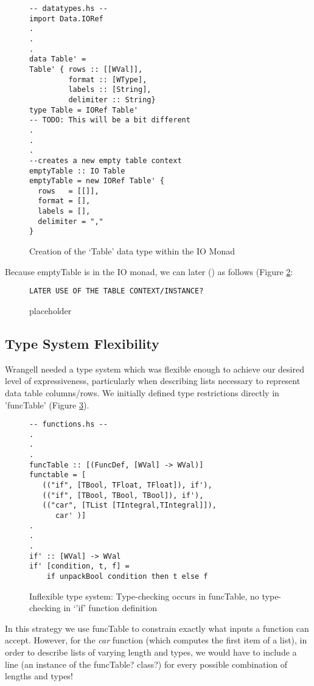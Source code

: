\documentclass[preprint,nocopyrightspace]{sig-alternate}
\begin{document}
\begin{figure}
\caption{Creation of the `Table' data type within the IO Monad}
\begin{lstlisting}
-- datatypes.hs --
import Data.IORef
.
.
.
data Table' = 
Table' { rows :: [[WVal]], 
         format :: [WType], 
         labels :: [String], 
         delimiter :: String}
type Table = IORef Table' 
-- TODO: This will be a bit different
.
.
.
--creates a new empty table context
emptyTable :: IO Table
emptyTable = new IORef Table' {    
  rows   = [[]],
  format = [],
  labels = [],
  delimiter = ","
}
\end{lstlisting}
\label{tableIORef}
\end{figure}
Because emptyTable is in the IO monad, we can later () as follows (Figure \ref{tableIoRefLaterUse}:
\begin{figure}
\caption{placeholder}
\begin{lstlisting}
LATER USE OF THE TABLE CONTEXT/INSTANCE?
\end{lstlisting}
\label{tableIoRefLaterUse}
\end{figure}

\subsection{Type System Flexibility}
Wrangell needed a type system which was flexible enough to achieve our desired level of expressiveness, particularly when describing lists necessary to represent data table columns/rows. We initially defined type restrictions directly in 'funcTable' (Figure \ref{fig:inflexType}).
\begin{figure}
\caption{Inflexible type system: Type-checking occurs in funcTable, no type-checking in `'if' function definition}
\begin{lstlisting}
-- functions.hs --
.
.
.
funcTable :: [(FuncDef, [WVal] -> WVal)] 
functable = [
   (("if", [TBool, TFloat, TFloat]), if'),
   (("if", [TBool, TBool, TBool]), if'),
   (("car", [TList [TIntegral,TIntegral]]), 
      car' )]    
.
.
.          
if' :: [WVal] -> WVal
if' [condition, t, f] = 
    if unpackBool condition then t else f

\end{lstlisting}
\label{fig:inflexType}
\end{figure}
In this strategy we use funcTable to constrain exactly what inputs a function can accept. However, for the \emph{car} function (which computes the first item of a list), in order to describe lists of varying length and types, we would have to include a line (an instance of the funcTable? class?) for every possible combination of lengths and types!
\end{document}
